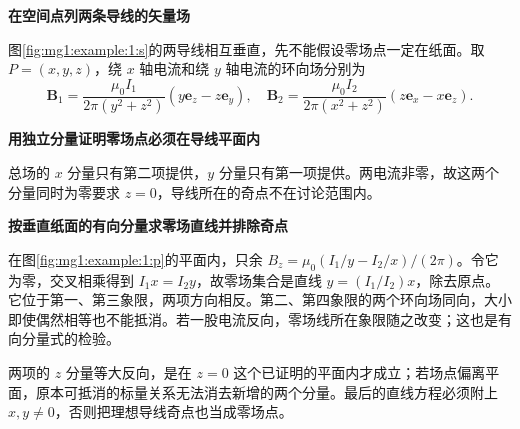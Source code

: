 \begin{solution}\textbf{在空间点列两条导线的矢量场}\par\nobreak
图\ref{fig:mg1:example:1:s}的两导线相互垂直，先不能假设零场点一定在纸面。取 $P=(x,y,z)$，绕 $x$ 轴电流和绕 $y$ 轴电流的环向场分别为
\[
\bm B_1=\frac{\mu_0I_1}{2\pi(y^2+z^2)}(y\bm e_z-z\bm e_y),\quad
\bm B_2=\frac{\mu_0I_2}{2\pi(x^2+z^2)}(z\bm e_x-x\bm e_z).
\]


\par\medskip{}\noindent\textbf{用独立分量证明零场点必须在导线平面内}\par\nobreak
总场的 $x$ 分量只有第二项提供，$y$ 分量只有第一项提供。两电流非零，故这两个分量同时为零要求 $z=0$，导线所在的奇点不在讨论范围内。



\par\medskip{}\noindent\textbf{按垂直纸面的有向分量求零场直线并排除奇点}\par\nobreak
在图\ref{fig:mg1:example:1:p}的平面内，只余 $B_z=\mu_0(I_1/y-I_2/x)/(2\pi)$。令它为零，交叉相乘得到 $I_1x=I_2y$，故零场集合是直线 $y=(I_1/I_2)x$，除去原点。它位于第一、第三象限，两项方向相反。第二、第四象限的两个环向场同向，大小即使偶然相等也不能抵消。若一股电流反向，零场线所在象限随之改变；这也是有向分量式的检验。

两项的 $z$ 分量等大反向，是在 $z=0$ 这个已证明的平面内才成立；若场点偏离平面，原本可抵消的标量关系无法消去新增的两个分量。最后的直线方程必须附上 $x,y\ne0$，否则把理想导线奇点也当成零场点。\end{solution}
